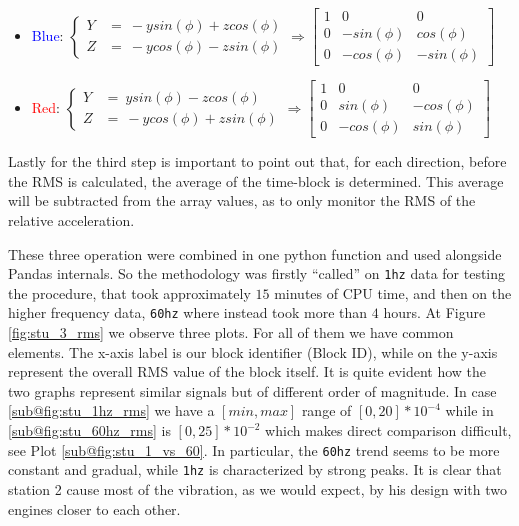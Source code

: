\begin{itemize}
    \item \textcolor{blue}{Blue}: \( \left\{ 
        \begin{array}{cl} 
            Y & = \ -y sin(\phi) + z cos(\phi) \\
            Z & = \ -y cos(\phi) - z sin(\phi) 
        \end{array} \right. 
        \Rightarrow  
        \begin{bmatrix}
            1 & 0 & 0 \\
            0 & -sin(\phi) & cos(\phi)  \\
            0 & -cos(\phi) & -sin(\phi)  
        \end{bmatrix} \)
    \item \textcolor{red}{Red}: \( \left\{ 
        \begin{array}{cl}
            Y & = \ y sin(\phi) - z cos(\phi) \\
            Z & = \ -y cos(\phi) + z sin(\phi) 
        \end{array} \right. 
        \Rightarrow
        \begin{bmatrix}
            1 & 0 & 0 \\
            0 & sin(\phi) & -cos(\phi)  \\
            0 & -cos(\phi) & sin(\phi)  
        \end{bmatrix} \)
\end{itemize}
Lastly for the third step is important to point out that, for each direction, before the RMS is calculated, the average of the time-block is determined. 
This average will be subtracted from the array values, as to only monitor the RMS of the relative acceleration.

These three operation were combined in one python function and used alongside Pandas internals. So the methodology was firstly ``called'' on \texttt{1hz} data for testing the procedure, that took approximately $15$ minutes of CPU time, 
and then on the higher frequency data, \texttt{60hz} where instead took more than $4$ hours. At Figure \ref{fig:stu_3_rms} we observe three plots.
For all of them we have common elements. The x-axis label is our block identifier (Block ID), while on the y-axis represent the overall RMS value of the block itself. 
It is quite evident how the two graphs represent similar signals but of different order of magnitude. In case \ref{sub@fig:stu_1hz_rms} we have a $[min, max]$ range of $[0,20] * 10^{-4}$ 
while in \ref{sub@fig:stu_60hz_rms} is $[0,25] * 10^{-2}$ which makes direct comparison difficult, see Plot \ref{sub@fig:stu_1_vs_60}.
In particular, the \texttt{60hz} trend seems to be more constant and gradual, while \texttt{1hz} is characterized by strong peaks. It is clear that station 2 cause most of the vibration, 
as we would expect, by his design with two engines closer to each other.

